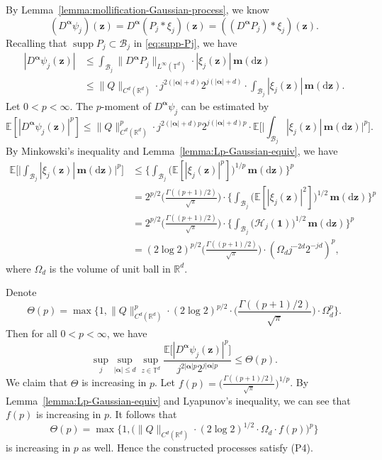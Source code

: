 \documentclass[12pt]{amsart}
\theoremstyle{definition}
\theoremstyle{remark}
\newcommand{\bz}{\boldsymbol{z}}
\newcommand{\R}{\mathbb{R}}
\newcommand{\E}{\mathbb{E}}
\newcommand{\T}{\mathbb{T}}
\newcommand{\supp}{\operatorname{supp}}
\numberwithin{equation}{section}
\begin{document}
By Lemma~\ref{lemma:mollification-Gaussian-process}, we know
\[
(D^{\boldsymbol{\alpha}} \psi_j)(\bz)=D^{\boldsymbol{\alpha}} (P_j*\xi_j)(\bz)=((D^{\boldsymbol{\alpha}} P_j)*\xi_j)(\bz).
\]
Recalling that $\supp P_j\subset \mathcal{B}_j$ in \eqref{eq:supp-Pj}, we have
\begin{align*}
|D^{\boldsymbol{\alpha}} \psi_j(\bz)|&\le \int_{\mathcal{B}_j}\|D^{\boldsymbol{\alpha}} P_j\|_{L^\infty(\T^d)}\cdot |\xi_j(\bz)|\,\boldsymbol{m}(\mathrm{d}\bz)\\
&\le \|Q\|_{C^d(\R^d)}\cdot j^{2(|\boldsymbol{\alpha}|+d)}2^{j(|\boldsymbol{\alpha}|+d)}\cdot \int_{\mathcal{B}_j}|\xi_j(\bz)|\,\boldsymbol{m}(\mathrm{d}\bz).
\end{align*}
Let $0<p<\infty$. The $p$-moment of $D^{\boldsymbol{\alpha}}\psi_j$ can be estimated by
\[
\E[|D^{\boldsymbol{\alpha}} \psi_j(\bz)|^p]\le \|Q\|_{C^d(\R^d)}^p\cdot j^{2(|\boldsymbol{\alpha}|+d)p}2^{j(|\boldsymbol{\alpha}|+d)p}\cdot \E\bigg[\bigg|\int_{\mathcal{B}_j}|\xi_j(\bz)|\,\boldsymbol{m}(\mathrm{d}\bz)\bigg|^p\bigg].
\]
By Minkowski's inequality and Lemma~\ref{lemma:Lp-Gaussian-equiv}, we have	
\begin{align*}
\E\bigg[\bigg|\int_{\mathcal{B}_j}|\xi_j(\bz)|\,\boldsymbol{m}(\mathrm{d}\bz)\bigg|^p\bigg]&\le \bigg\{\int_{\mathcal{B}_j}\big(\E[|\xi_j(\bz)|^p]\big)^{1/p}\,\boldsymbol{m}(\mathrm{d}\bz)\bigg\}^p\\
&=2^{p/2}\bigg(\frac{\Gamma((p+1)/2)}{\sqrt{\pi}}\bigg)\cdot \bigg\{\int_{\mathcal{B}_j}\big(\E[|\xi_j(\bz)|^2]\big)^{1/2}\,\boldsymbol{m}(\mathrm{d}\bz)\bigg\}^p\\
&=2^{p/2}\bigg(\frac{\Gamma((p+1)/2)}{\sqrt{\pi}}\bigg)\cdot \bigg\{\int_{\mathcal{B}_j}\big(\mathcal{H}_j(\boldsymbol{1})\big)^{1/2}\,\boldsymbol{m}(\mathrm{d}\bz)\bigg\}^p\\
&=(2\log 2)^{p/2}\bigg(\frac{\Gamma((p+1)/2)}{\sqrt{\pi}}\bigg)\cdot (\Omega_d j^{-2d}2^{-jd})^p,
\end{align*}
where $\Omega_d$ is the volume of unit ball in $\R^d$.

Denote
\[
\Theta(p)=\max\bigg\{1,\|Q\|_{C^d(\R^d)}^p\cdot (2\log 2)^{p/2}\cdot \bigg(\frac{\Gamma((p+1)/2)}{\sqrt{\pi}}\bigg)\cdot \Omega_d^p\bigg\}.
\]
Then for all $0<p<\infty$, we have
\[
\sup_{j}\sup_{|\boldsymbol{\alpha}|\le d}\sup_{z\in \T^d}\frac{\E\big[|D^{\boldsymbol{\alpha}} \psi_j(\bz)|^p\big]}{j^{2|\boldsymbol{\alpha}|p}2^{j|\boldsymbol{\alpha}|p}}\le \Theta(p).
\]
We claim that $\Theta$ is increasing in $p$. Let $f(p)=\big(\frac{\Gamma((p+1)/2)}{\sqrt{\pi}}\big)^{1/p}$. By Lemma~\ref{lemma:Lp-Gaussian-equiv} and Lyapunov's inequality, we can see that $f(p)$ is increasing in $p$. It follows that
\[
\Theta(p)=\max\Big\{1,\big(\|Q\|_{C^d(\R^d)}\cdot (2\log2)^{1/2}\cdot \Omega_d\cdot f(p)\big)^p\Big\}
\]
is increasing in $p$ as well. Hence the constructed processes satisfy (P4).
\end{document}
